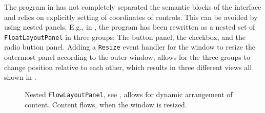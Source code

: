 The program in  has not completely separated the semantic blocks of the interface and relies on explicitly setting of coordinates of controls. This can be avoided by using nested panels. E.g., in , the program has been rewritten as a nested set of \lstinline{FloatLayoutPanel} in three groups: The button panel, the checkbox, and the radio button panel. Adding a \lstinline{Resize} event handler for the window to resize the outermost panel according to the outer window, allows for the three groups to change position relative to each other, which results in three different views all shown in .
%
%
%
\begin{figure}
  \centering
  \caption{Nested \lstinline!FlowLayoutPanel!, see , allows for dynamic arrangement of content. Content flows, when the window is resized.}
  \label{fig:flowLayoutPanelAdvanced}
\end{figure}


